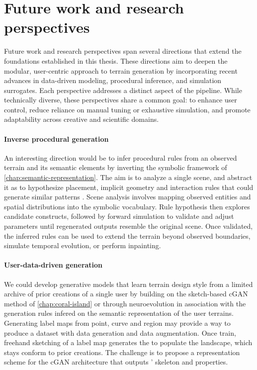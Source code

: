 \section*{Future work and research perspectives}

Future work and research perspectives span several directions that extend the foundations established in this thesis. These directions aim to deepen the modular, user-centric approach to terrain generation by incorporating recent advances in data-driven modeling, procedural inference, and simulation surrogates. Each perspective addresses a distinct aspect of the pipeline. While technically diverse, these perspectives share a common goal: to enhance user control, reduce reliance on manual tuning or exhaustive simulation, and promote adaptability across creative and scientific domains.



\paragraph{Inverse procedural generation} An interesting direction would be to infer procedural rules from an observed terrain and its semantic elements by inverting the symbolic framework of \cref{chap:semantic-representation}. The aim is to analyze a single scene, and abstract it as  to hypothesize placement, implicit geometry \cite{Guerin2016a} and interaction rules that could generate similar patterns \cite{Stava2010,Stava2014}. Scene analysis involves mapping observed entities and spatial distributions \cite{Emilien2015a} into the symbolic vocabulary. Rule hypothesis then explores candidate constructs, followed by forward simulation to validate and adjust parameters until regenerated outputs resemble the original scene. Once validated, the inferred rules can be used to extend the terrain beyond observed boundaries, simulate temporal evolution, or perform inpainting.

\paragraph{User-data-driven generation} We could develop generative models that learn terrain design style from a limited archive of prior creations of a single user by building on the sketch-based cGAN method of \cref{chap:coral-island} or through neuroevolution \cite{Stanley2005,Cortes2024} in association with the generation rules infered on the semantic representation of the user terrains. Generating label maps from point, curve and region  may provide a way to produce a dataset with data generation and data augmentation. Once train, freehand sketching of a label map generates the  to populate the landscape, which stays conform to prior creations. The challenge is to propose a representation scheme for the cGAN architecture that outputs ' skeleton and properties.

